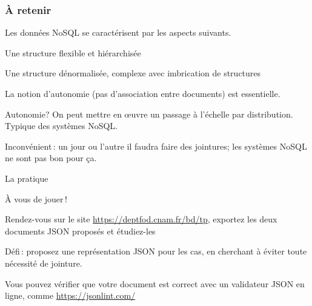 \begin{frame}[fragile]
\frametitle{À retenir}

Les données NoSQL  se caractérisent par les aspects suivants.

\begin{redbullet}
  \item Une structure \alert{flexible} et \alert{hiérarchisée}
  \item Une structure dénormalisée, complexe avec imbrication de structures
 \end{redbullet}
 
\vfill
La notion \alert{d'autonomie} (pas d'association entre documents) est essentielle.
\begin{redbullet}
       \item Autonomie? On peut mettre en {\oe}uvre un \alert{passage à l'échelle par
       distribution}. Typique des systèmes NoSQL.
       \item Inconvénient\,: un jour ou l'autre il faudra faire des jointures; 
          les systèmes NoSQL ne sont pas bon pour ça.
 \end{redbullet}

\end{frame}


\begin{frame}{La pratique}

À vous de jouer\,!

\vfill


Rendez-vous sur le site \url{https://deptfod.cnam.fr/bd/tp}, exportez les
deux documents JSON proposés et étudiez-les

\vfill

\alert{Défi}\,: proposez une représentation JSON pour les cas, en 
cherchant à éviter toute nécessité de jointure.

\vfill

Vous pouvez vérifier que votre document est correct avec un validateur JSON
en ligne, comme \url{https://jsonlint.com/}

\end{frame}